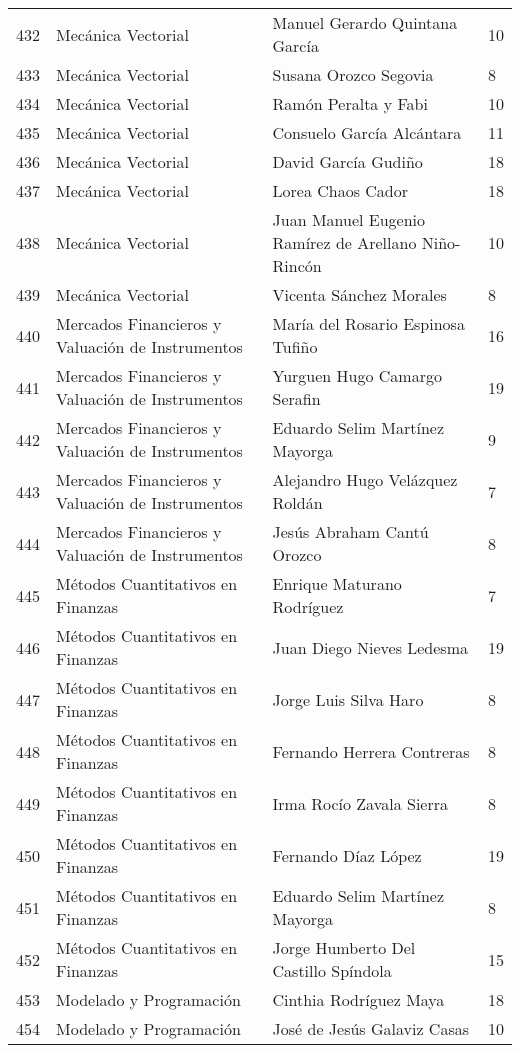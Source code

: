 \begin{table}[ht]
\begin{tabular}{rlll}
  432 & Mecánica Vectorial & Manuel Gerardo Quintana García & 10 \\ 
  433 & Mecánica Vectorial & Susana Orozco Segovia & 8 \\ 
  434 & Mecánica Vectorial & Ramón Peralta y Fabi & 10 \\ 
  435 & Mecánica Vectorial & Consuelo García Alcántara & 11 \\ 
  436 & Mecánica Vectorial & David García Gudiño & 18 \\ 
  437 & Mecánica Vectorial & Lorea Chaos Cador & 18 \\ 
  438 & Mecánica Vectorial & Juan Manuel Eugenio Ramírez de Arellano Niño-Rincón & 10 \\ 
  439 & Mecánica Vectorial & Vicenta Sánchez Morales & 8 \\ 
  440 & Mercados Financieros y Valuación de Instrumentos & María del Rosario Espinosa Tufiño & 16 \\ 
  441 & Mercados Financieros y Valuación de Instrumentos & Yurguen Hugo Camargo Serafin & 19 \\ 
  442 & Mercados Financieros y Valuación de Instrumentos & Eduardo Selim Martínez Mayorga & 9 \\ 
  443 & Mercados Financieros y Valuación de Instrumentos & Alejandro Hugo Velázquez Roldán & 7 \\ 
  444 & Mercados Financieros y Valuación de Instrumentos & Jesús Abraham Cantú Orozco & 8 \\ 
  445 & Métodos Cuantitativos en Finanzas & Enrique Maturano Rodríguez & 7 \\ 
  446 & Métodos Cuantitativos en Finanzas & Juan Diego Nieves Ledesma & 19 \\ 
  447 & Métodos Cuantitativos en Finanzas & Jorge Luis Silva Haro & 8 \\ 
  448 & Métodos Cuantitativos en Finanzas & Fernando Herrera Contreras & 8 \\ 
  449 & Métodos Cuantitativos en Finanzas & Irma Rocío Zavala Sierra & 8 \\ 
  450 & Métodos Cuantitativos en Finanzas & Fernando Díaz López & 19 \\ 
  451 & Métodos Cuantitativos en Finanzas & Eduardo Selim Martínez Mayorga & 8 \\ 
  452 & Métodos Cuantitativos en Finanzas & Jorge Humberto Del Castillo Spíndola & 15 \\ 
  453 & Modelado y Programación & Cinthia Rodríguez Maya & 18 \\ 
  454 & Modelado y Programación & José de Jesús Galaviz Casas & 10 \\ 

\end{tabular}
\end{table}
